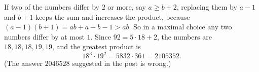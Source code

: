 If two of the numbers differ by $2$ or more, say $a\ge b+2$, replacing them by $a-1$ and $b+1$ keeps the sum and increases the product, because $(a-1)(b+1)=ab+a-b-1>ab$. So in a maximal choice any two numbers differ by at most $1$. Since $92=5\cdot18+2$, the numbers are $18,18,18,19,19$, and the greatest product is
\[
18^3\cdot19^2=5832\cdot361=\boxed{2105352}.
\]
(The answer $2046528$ suggested in the post is wrong.)

